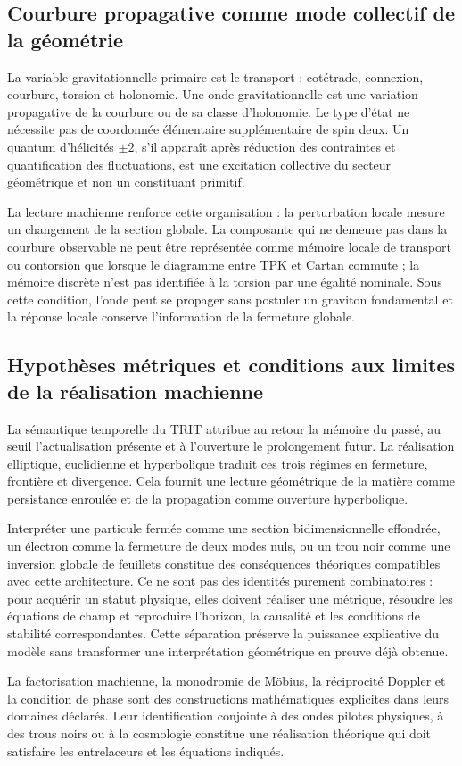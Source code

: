 \subsection{Courbure propagative comme mode collectif de la géométrie}

La variable gravitationnelle primaire est le transport : cotétrade, connexion, courbure, torsion et holonomie. Une onde gravitationnelle est une variation propagative de la courbure ou de sa classe d’holonomie. Le type d’état ne nécessite pas de coordonnée élémentaire supplémentaire de spin deux. Un quantum d’hélicités \(\pm2\), s’il apparaît après réduction des contraintes et quantification des fluctuations, est une excitation collective du secteur géométrique et non un constituant primitif.

La lecture machienne renforce cette organisation : la perturbation locale mesure un changement de la section globale. La composante qui ne demeure pas dans la courbure observable ne peut être représentée comme mémoire locale de transport ou contorsion que lorsque le diagramme entre TPK et Cartan commute ; la mémoire discrète n’est pas identifiée à la torsion par une égalité nominale. Sous cette condition, l’onde peut se propager sans postuler un graviton fondamental et la réponse locale conserve l’information de la fermeture globale.

\subsection{Hypothèses métriques et conditions aux limites de la réalisation machienne}

La sémantique temporelle du TRIT attribue au retour la mémoire du passé, au seuil l’actualisation présente et à l’ouverture le prolongement futur. La réalisation elliptique, euclidienne et hyperbolique traduit ces trois régimes en fermeture, frontière et divergence. Cela fournit une lecture géométrique de la matière comme persistance enroulée et de la propagation comme ouverture hyperbolique.

Interpréter une particule fermée comme une section bidimensionnelle effondrée, un électron comme la fermeture de deux modes nuls, ou un trou noir comme une inversion globale de feuillets constitue des conséquences théoriques compatibles avec cette architecture. Ce ne sont pas des identités purement combinatoires : pour acquérir un statut physique, elles doivent réaliser une métrique, résoudre les équations de champ et reproduire l’horizon, la causalité et les conditions de stabilité correspondantes. Cette séparation préserve la puissance explicative du modèle sans transformer une interprétation géométrique en preuve déjà obtenue.

\begin{statusbox}
La factorisation machienne, la monodromie de Möbius, la réciprocité Doppler et la condition de phase sont des constructions mathématiques explicites dans leurs domaines déclarés. Leur identification conjointe à des ondes pilotes physiques, à des trous noirs ou à la cosmologie constitue une réalisation théorique qui doit satisfaire les entrelaceurs et les équations indiqués.
\end{statusbox}
